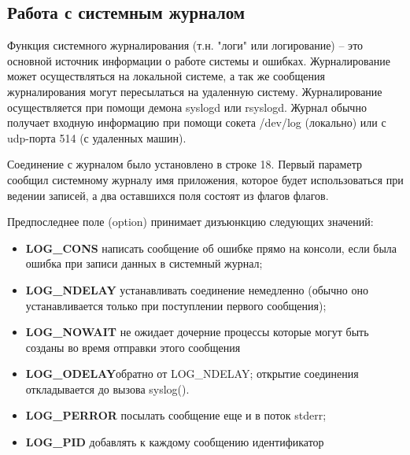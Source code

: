 \subsection{Работа с системным журналом}

Функция системного журналирования (т.н. "логи" или логирование) -- это основной источник информации о работе системы и ошибках. Журналирование может осуществляться на локальной системе, а так же сообщения журналирования могут пересылаться на удаленную систему. Журналирование осуществляется при помощи демона syslogd или rsyslogd. Журнал обычно получает входную информацию при помощи сокета /dev/log (локально) или с udp-порта 514 (с удаленных машин)\cite{Cit3}.

Соединение с журналом было установлено в строке 18. Первый параметр сообщил системному журналу имя приложения, которое будет использоваться при ведении записей, а два оставшихся поля состоят из флагов флагов\cite{Cit2}.

Предпоследнее поле (option) принимает дизъюнкцию следующих значений:
\begin{itemize}
\item \textbf{LOG\_CONS} написать сообщение об ошибке прямо на консоли, если была ошибка при записи данных в системный журнал; 
\item \textbf{LOG\_NDELAY} устанавливать соединение немедленно (обычно оно устанавливается только при поступлении первого сообщения); 
\item \textbf{LOG\_NOWAIT} не ожидает дочерние процессы которые могут быть созданы во время отправки этого сообщения
\item \textbf{LOG\_ODELAY}обратно от LOG\_NDELAY; открытие соединения откладывается до вызова syslog(). 
\item \textbf{LOG\_PERROR} посылать сообщение еще и в поток stderr; 
\item \textbf{LOG\_PID} добавлять к каждому сообщению идентификатор 
\end{itemize}

